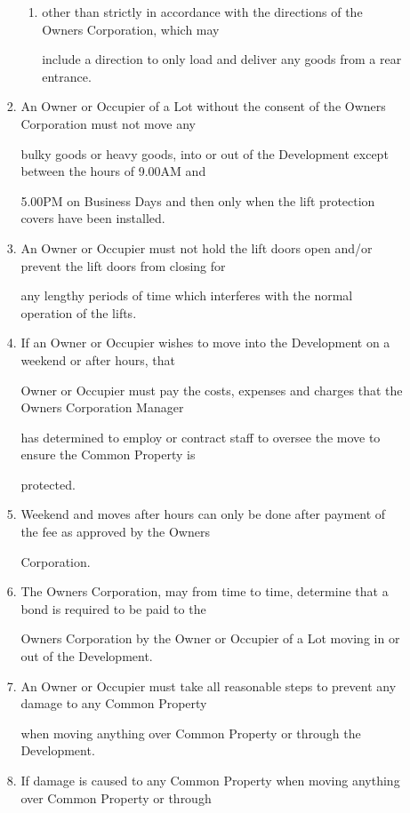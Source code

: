 \documentclass{article}
\begin{document}
\begin{enumerate}[label=\arabic*.]
\begin{enumerate}[label=\arabic{enumi}.\arabic*.]
\begin{enumerate}[label=(\arabic*)]
\begin{enumerate}[label=(\alph*)]
\item  other than strictly in accordance with the directions of the Owners Corporation, which may 

include a direction to only load and deliver any goods from a rear entrance. 

\end{enumerate}
\item  An Owner or Occupier of a Lot without the consent of the Owners Corporation must not move any 

bulky goods or heavy goods, into or out of the Development except between the hours of 9.00AM and 

5.00PM on Business Days and then only when the lift protection covers have been installed. 

\item  An Owner or Occupier must not hold the lift doors open and/or prevent the lift doors from closing for 

any lengthy periods of time which interferes with the normal operation of the lifts. 

\item  If an Owner or Occupier wishes to move into the Development on a weekend or after hours, that 

Owner or Occupier must pay the costs, expenses and charges that the Owners Corporation Manager 

has determined to employ or contract staff to oversee the move to ensure the Common Property is 

protected. 

\item  Weekend and moves after hours can only be done after payment of the fee as approved by the Owners 

Corporation. 

\item  The Owners Corporation, may from time to time, determine that a bond is required to be paid to the 

Owners Corporation by the Owner or Occupier of a Lot moving in or out of the Development. 

\item  An Owner or Occupier must take all reasonable steps to prevent any damage to any Common Property 

when moving anything over Common Property or through the Development. 

\item  If damage is caused to any Common Property when moving anything over Common Property or through 


\end{enumerate}
\end{enumerate}
\end{enumerate}
\end{document}
